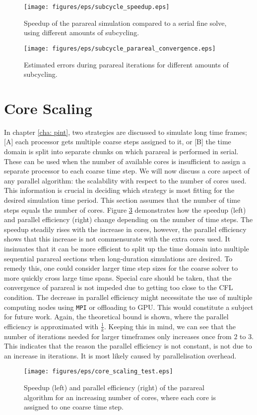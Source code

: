   \begin{figure}[h]
    \centering
    \texttt{[image: figures/eps/subcycle\_speedup.eps]}
    \caption{Speedup of the parareal simulation compared to a serial fine solve, using different amounts of subcycling.}
    \label{fig: temporal-subcycling}
\end{figure}

  \begin{figure}[h]
    \centering
    \texttt{[image: figures/eps/subcycle\_parareal\_convergence.eps]}
    \caption{Estimated errors during parareal iterations for different amounts of subcycling.}
    \label{fig: temporal-subcycling-errors}
\end{figure}

\section{Core Scaling}
In chapter \ref{cha: pint}, two strategies are discussed to simulate long time frames; [A] each processor gets multiple coarse steps assigned to it, or [B] the time domain is split into separate chunks on which parareal is performed in serial. These can be used when the number of available cores is insufficient to assign a separate processor to each coarse time step. 
We will now discuss a core aspect of any parallel algorithm: the scalability with respect to the number of cores used. This information is crucial in deciding which strategy is most fitting for the desired simulation time period. This section assumes that the number of time steps equals the number of cores. Figure \ref{fig: core scaling} demonstrates how the speedup (left) and parallel efficiency (right) change depending on the number of time steps. The speedup steadily rises with the increase in cores, however, the parallel efficiency shows that this increase is not commensurate with the extra cores used. It insinuates that it can be more efficient to split up the time domain into multiple sequential parareal sections when long-duration simulations are desired. To remedy this, one could consider larger time step sizes for the coarse solver to more quickly cross large time spans. Special care should be taken, that the convergence of parareal is not impeded due to getting too close to the CFL condition. The decrease in parallel efficiency might necessitate the use of multiple computing nodes using \texttt{MPI} or offloading to GPU. This would constitute a subject for future work. Again, the theoretical bound is shown, where the parallel efficiency is approximated with $\frac{1}{k}$. Keeping this in mind, we can see that the number of iterations needed for larger timeframes only increases once from $2$ to $3$. This indicates that the reason the parallel efficiency is not constant, is not due to an increase in iterations. It is most likely caused by parallelisation overhead.
  \begin{figure}[h]
    \centering
    \texttt{[image: figures/eps/core\_scaling\_test.eps]}
    \caption{Speedup (left) and parallel efficiency (right) of the parareal algorithm for an increasing number of cores, where each core is assigned to one coarse time step.}
    \label{fig: core scaling}
\end{figure}

